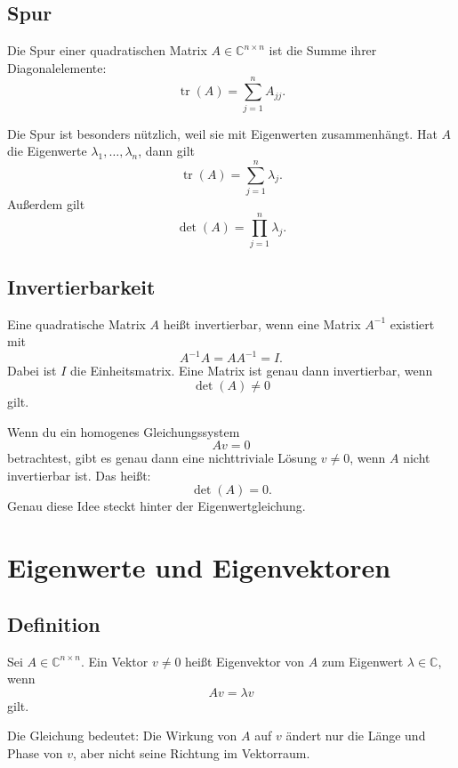 \subsection{Spur}

\begin{definitionbox}
Die Spur einer quadratischen Matrix $A\in\mathbb{C}^{n\times n}$ ist die Summe ihrer Diagonalelemente:
\[
    \operatorname{tr}(A)=\sum_{j=1}^{n}A_{jj}.
\]
\end{definitionbox}

Die Spur ist besonders nützlich, weil sie mit Eigenwerten zusammenhängt. Hat $A$ die Eigenwerte $\lambda_1,\dots,\lambda_n$, dann gilt
\[
    \operatorname{tr}(A)=\sum_{j=1}^{n}\lambda_j.
\]
Außerdem gilt
\[
    \det(A)=\prod_{j=1}^{n}\lambda_j.
\]

\subsection{Invertierbarkeit}

Eine quadratische Matrix $A$ heißt invertierbar, wenn eine Matrix $A^{-1}$ existiert mit
\[
    A^{-1}A=AA^{-1}=I.
\]
Dabei ist $I$ die Einheitsmatrix. Eine Matrix ist genau dann invertierbar, wenn
\[
    \det(A)\ne 0
\]
gilt.

\begin{examtipbox}
Wenn du ein homogenes Gleichungssystem
\[
    Av=0
\]
betrachtest, gibt es genau dann eine nichttriviale Lösung $v\ne 0$, wenn $A$ nicht invertierbar ist. Das heißt:
\[
    \det(A)=0.
\]
Genau diese Idee steckt hinter der Eigenwertgleichung.
\end{examtipbox}

\section{Eigenwerte und Eigenvektoren}

\subsection{Definition}

\begin{definitionbox}
Sei $A\in\mathbb{C}^{n\times n}$. Ein Vektor $v\ne 0$ heißt Eigenvektor von $A$ zum Eigenwert $\lambda\in\mathbb{C}$, wenn
\[
    Av=\lambda v
\]
gilt.
\end{definitionbox}

Die Gleichung bedeutet: Die Wirkung von $A$ auf $v$ ändert nur die Länge und Phase von $v$, aber nicht seine Richtung im Vektorraum.

